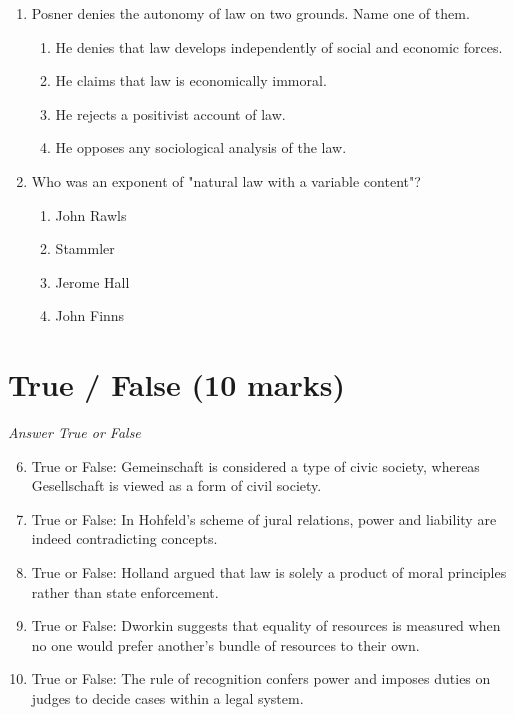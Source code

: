 \documentclass[12pt]{article}
\begin{document}
\begin{enumerate}[label=\arabic*.]
\item Posner denies the autonomy of law on two grounds. Name one of them.
\begin{enumerate}[label=(\alph*)]
    \item He denies that law develops independently of social and economic forces.
    \item He claims that law is economically immoral.
    \item He rejects a positivist account of law.
    \item He opposes any sociological analysis of the law.
\end{enumerate}
\item Who was an exponent of "natural law with a variable content"?
\begin{enumerate}[label=(\alph*)]
    \item John Rawls
    \item Stammler
    \item Jerome Hall
    \item John Finns
\end{enumerate}
\end{enumerate}

\section*{True / False (10 marks)}
\textit{Answer True or False}
\begin{enumerate}[label=\arabic*.]
\setcounter{enumi}{5}
\item True or False: Gemeinschaft is considered a type of civic society, whereas Gesellschaft is viewed as a form of civil society.
\item True or False: In Hohfeld's scheme of jural relations, power and liability are indeed contradicting concepts.
\item True or False: Holland argued that law is solely a product of moral principles rather than state enforcement.
\item True or False: Dworkin suggests that equality of resources is measured when no one would prefer another's bundle of resources to their own.
\item True or False: The rule of recognition confers power and imposes duties on judges to decide cases within a legal system.
\end{enumerate}
\end{document}
